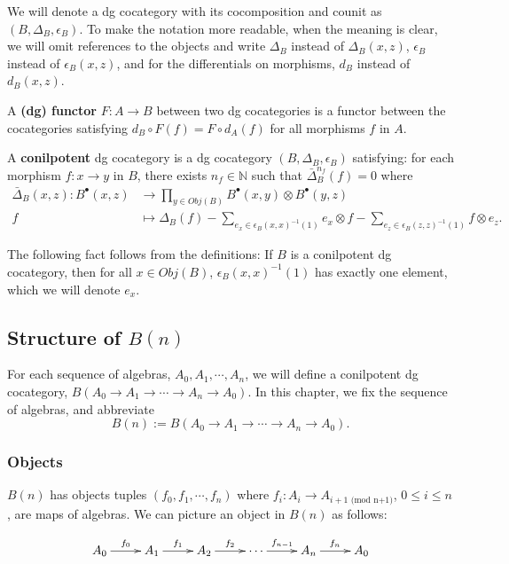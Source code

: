 We will denote a dg cocategory with its 
cocomposition and counit as $(B, \Delta_B, 
\epsilon_B)$. To make the notation more 
readable, when the meaning is clear, 
we will omit references to the 
objects and write $\Delta_B$ instead of 
$\Delta_B(x,z)$, $\epsilon_B$ instead of 
$\epsilon_B(x,z)$, and for the differentials 
on morphisms, $d_B$ instead of $d_B(x,z)$.
%
\begin{defn} A \textbf{(dg) functor} $F: A \to B$ 
between two dg cocategories is a functor 
between the cocategories satisfying 
$d_B\circ F(f) = F\circ d_A(f)$ for all 
morphisms $f$ in $A$.
\end{defn}
%
\begin{defn} A \textbf{conilpotent} dg 
cocategory is a dg cocategory $(B, 
\Delta_B, \epsilon_B)$ satisfying: for each 
morphism $f:x\to y$ in $B$, there exists 
$n_f \in \mathbb{N}$ such that 
$\bar{\Delta}_B^{n_f}(f) = 0$
where
\begin{align*}
\bar{\Delta}_B(x,z): B^\bullet(x,z) 
&\to 
  \prod \limits_{y \in Obj(B)} 
  B^\bullet(x,y) \otimes
  B^\bullet(y,z)\\
f
&\mapsto
\Delta_B(f)
- \sum \limits_{e_x \in 
  \epsilon_B(x,x)^{-1}(1)}
  e_x \otimes f
- \sum \limits_{e_z \in 
  \epsilon_B(z,z)^{-1}(1)}
  f \otimes e_z. 
\end{align*}
\end{defn}
%
The following fact follows from the 
definitions: 
If $B$ is a conilpotent dg cocategory, 
then for all $x \in Obj(B)$, 
$\epsilon_B(x,x)^{-1}(1)$ has exactly 
one element, which we will denote $e_x$.
%
\subsection{Structure of $B(n)$}
For each sequence of algebras, 
$A_0, A_1, \cdots, A_n$, 
we will define a conilpotent dg cocategory, 
$B(A_0 \to A_1 \to \cdots \to A_n \to A_0)$. 
In this chapter, we fix the sequence of 
algebras, and abbreviate 
$$
B(n):= B(A_0 \to A_1 \to \cdots \to A_n \to A_0).
$$
%
\subsubsection{Objects}
$B(n)$ has objects tuples $(f_0, f_1, \cdots, f_n)$ where $f_i : A_i \to A_{i+1 \textrm{ (mod n+1)}}$, $0 \leq i \leq n$, are maps of algebras. We can picture an object in $B(n)$ as follows:

\begin{equation*}
\xymatrix{
A_0 \ar[r]^{f_0}
& A_1 \ar[r]^{f_1}
& A_2 \ar[r]^{f_2}
& \cdots \ar[r]^{f_{n-1}}
& A_n \ar[r]^{f_n}
& A_0
}
\end{equation*}

